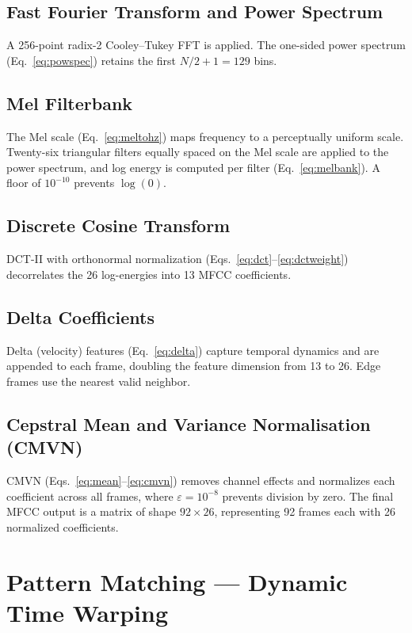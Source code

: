 \documentclass[conference]{IEEEtran}
\begin{document}
\subsection{Fast Fourier Transform and Power Spectrum}
A 256-point radix-2 Cooley--Tukey FFT is applied. The one-sided power
spectrum (Eq.~\ref{eq:powspec}) retains the first $N/2 + 1 = 129$ bins.

\subsection{Mel Filterbank}
The Mel scale (Eq.~\ref{eq:meltohz}) maps frequency to a perceptually
uniform scale. Twenty-six triangular filters equally spaced on the Mel
scale are applied to the power spectrum, and log energy is computed per
filter (Eq.~\ref{eq:melbank}). A floor of $10^{-10}$ prevents $\log(0)$.

\subsection{Discrete Cosine Transform}
DCT-II with orthonormal normalization (Eqs.~\ref{eq:dct}--\ref{eq:dctweight})
decorrelates the 26 log-energies into 13 MFCC coefficients.

\subsection{Delta Coefficients}
Delta (velocity) features (Eq.~\ref{eq:delta}) capture temporal dynamics
and are appended to each frame, doubling the feature dimension from 13
to 26. Edge frames use the nearest valid neighbor.

\subsection{Cepstral Mean and Variance Normalisation (CMVN)}
CMVN (Eqs.~\ref{eq:mean}--\ref{eq:cmvn}) removes channel effects and
normalizes each coefficient across all frames, where
$\varepsilon = 10^{-8}$ prevents division by zero.
The final MFCC output is a matrix of shape $92 \times 26$, representing
92 frames each with 26 normalized coefficients.

\section{Pattern Matching --- Dynamic Time Warping} \label{sec:dtw}
\end{document}
